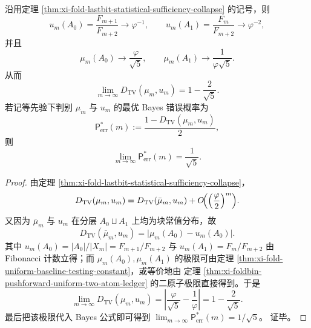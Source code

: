 \begin{corollary}[相对稳定层均匀基线的黄金判别门槛]\label{cor:xi-fold-uniform-baseline-golden-threshold}
沿用定理 \ref{thm:xi-fold-lastbit-statistical-sufficiency-collapse} 的记号，则
\[
u_m(A_0)=\frac{F_{m+1}}{F_{m+2}}\longrightarrow \varphi^{-1},
\qquad
u_m(A_1)=\frac{F_m}{F_{m+2}}\longrightarrow \varphi^{-2},
\]
并且
\[
\mu_m(A_0)\longrightarrow \frac{\varphi}{\sqrt5},
\qquad
\mu_m(A_1)\longrightarrow \frac{1}{\varphi\sqrt5}.
\]
从而
\[
\boxed{\;
\lim_{m\to\infty}D_{\mathrm{TV}}(\mu_m,u_m)
=
1-\frac{2}{\sqrt5}.\;}
\]
若记等先验下判别 \(\mu_m\) 与 \(u_m\) 的最优 Bayes 错误概率为
\[
\mathsf P_{\mathrm{err}}^\ast(m)
:=
\frac{1-D_{\mathrm{TV}}(\mu_m,u_m)}{2},
\]
则
\[
\boxed{\;
\lim_{m\to\infty}\mathsf P_{\mathrm{err}}^\ast(m)
=
\frac{1}{\sqrt5}.\;}
\]
\end{corollary}
\begin{proof}
由定理 \ref{thm:xi-fold-lastbit-statistical-sufficiency-collapse}，
\[
D_{\mathrm{TV}}(\mu_m,u_m)
=
D_{\mathrm{TV}}(\bar\mu_m,u_m)
+O\!\Bigl(\Bigl(\frac{\varphi}{2}\Bigr)^m\Bigr).
\]
又因为 \(\bar\mu_m\) 与 \(u_m\) 在分层 \(A_0\sqcup A_1\) 上均为块常值分布，故
\[
D_{\mathrm{TV}}(\bar\mu_m,u_m)
=
\bigl|\mu_m(A_0)-u_m(A_0)\bigr|.
\]
其中 \(u_m(A_0)=|A_0|/|X_m|=F_{m+1}/F_{m+2}\) 与
\(
u_m(A_1)=F_m/F_{m+2}
\)
由 Fibonacci 计数立得；而
\(
\mu_m(A_0),\mu_m(A_1)
\)
的极限可由定理 \ref{thm:xi-fold-uniform-baseline-testing-constant}，或等价地由
定理 \ref{thm:xi-foldbin-pushforward-uniform-two-atom-ledger} 的二原子极限直接得到。于是
\[
\lim_{m\to\infty}D_{\mathrm{TV}}(\mu_m,u_m)
=
\left|\frac{\varphi}{\sqrt5}-\frac1\varphi\right|
=
1-\frac{2}{\sqrt5}.
\]
最后把该极限代入 Bayes 公式即可得到
\(
\lim_{m\to\infty}\mathsf P_{\mathrm{err}}^\ast(m)=1/\sqrt5
\)。
证毕。
\end{proof}


